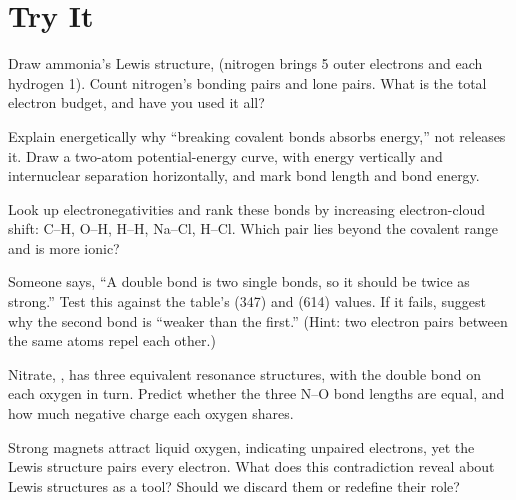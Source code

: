 \section*{Try It}

\begin{sikaoti}
\item Draw ammonia's Lewis structure,  (nitrogen brings 5 outer electrons and each hydrogen 1). Count nitrogen's bonding pairs and lone pairs. What is the total electron budget, and have you used it all?
\item Explain energetically why ``breaking covalent bonds absorbs energy,'' not releases it. Draw a two-atom potential-energy curve, with energy vertically and internuclear separation horizontally, and mark bond length and bond energy.
\item Look up electronegativities and rank these bonds by increasing electron-cloud shift: C--H, O--H, H--H, Na--Cl, H--Cl. Which pair lies beyond the covalent range and is more ionic?
\item Someone says, ``A double bond is two single bonds, so it should be twice as strong.'' Test this against the table's  (347) and  (614) values. If it fails, suggest why the second bond is ``weaker than the first.'' (Hint: two electron pairs between the same atoms repel each other.)
\item Nitrate, , has three equivalent resonance structures, with the double bond on each oxygen in turn. Predict whether the three N--O bond lengths are equal, and how much negative charge each oxygen shares.
\item Strong magnets attract liquid oxygen, indicating unpaired electrons, yet the Lewis structure  pairs every electron. What does this contradiction reveal about Lewis structures as a tool? Should we discard them or redefine their role?
\end{sikaoti}
